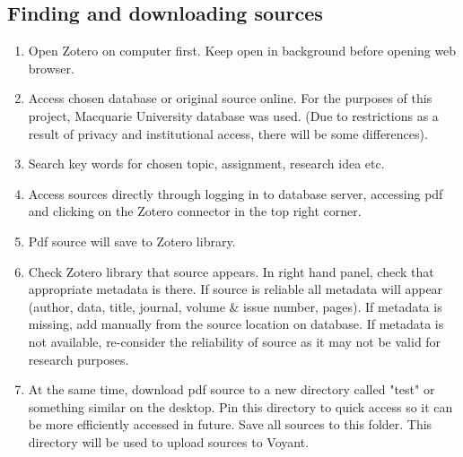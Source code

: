 \documentclass{article}
\begin{document}
\subsection{Finding and downloading sources}
\begin{enumerate}
\item Open Zotero on computer first. Keep open in background before opening web browser.
    \item Access chosen database or original source online. For the purposes of this project, Macquarie University database was used. (Due to restrictions as a result of privacy and institutional access, there will be some differences).
    \item Search key words for chosen topic, assignment, research idea etc.
    \item Access sources directly through logging in to database server, accessing pdf and clicking on the Zotero connector in the top right corner.
    \item Pdf source will save to Zotero library.
     \item Check Zotero library that source appears. In right hand panel, check that appropriate metadata is there. If source is reliable all metadata will appear (author, data, title, journal, volume & issue number, pages). If metadata is missing, add manually from the source location on database. If metadata is not available, re-consider the reliability of source as it may not be valid for research purposes.
    \item At the same time, download pdf source to a new directory called "test" or something similar on the desktop. Pin this directory to quick access so it can be more efficiently accessed in future. Save all sources to this folder. This directory will be used to upload sources to Voyant. 
  \end{enumerate}
\end{document}
